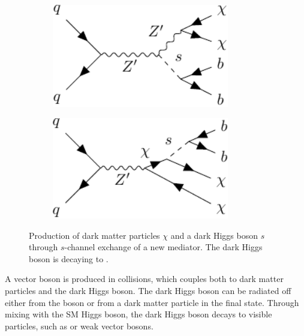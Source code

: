 \begin{figure}[hbtp]
  \centering
  \begin{subfigure}{.45\textwidth}
  	\centering
	\includegraphics[width=0.85\textwidth]{figures/monoS/physics/monos1.pdf}
    \caption{}
  \end{subfigure}
  \begin{subfigure}{.45\textwidth}
    \centering
    \includegraphics[width=0.85\textwidth]{figures/monoS/physics/monos2.pdf}
    \caption{}
  \end{subfigure}
  \caption{Production of dark matter particles \(\chi\) and a dark Higgs boson \(s\) through \(s\)-channel exchange of a new \PZprime mediator. The dark Higgs boson is decaying to \bquarks.}
  \label{fig:monoSbb:physics:2mdm:graph}
\end{figure}

A \PZprime vector boson is produced in \HepProcess{\Pp\Pp} collisions, which couples both to dark matter particles and the dark Higgs boson. The dark Higgs boson can be radiated off either from the \PZprime boson or from a dark matter particle in the final state. Through mixing with the SM Higgs boson, the dark Higgs boson decays to visible particles, such as \bquarks or weak vector bosons.

